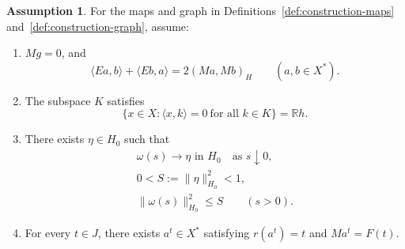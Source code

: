 \documentclass[11pt]{article}
\newcommand{\R}{\mathbb R}
\newcommand{\pair}[2]{\langle #1,#2\rangle}
\theoremstyle{definition}
\newtheorem{assumption}{Assumption}
\theoremstyle{remark}
\begin{document}
\begin{assumption}\label{ass:construction}
For the maps and graph in Definitions~\ref{def:construction-maps} and~\ref{def:construction-graph}, assume:
\begin{enumerate}
\renewcommand{\theenumi}{H\arabic{enumi}}
\renewcommand{\labelenumi}{(\theenumi)}
\item\label{ass:bilinear} $Mg=0$, and
\begin{equation}
\pair{Ea}{b}+\pair{Eb}{a}=2(Ma,Mb)_H
\qquad(a,b\in X^*).
\label{eq:abs-bilinear}
\end{equation}

\item\label{ass:annihilator} The subspace $K$ satisfies
\begin{equation}
\{x\in X:\pair{x}{k}=0\ \text{for all }k\in K\}=\R h.
\label{eq:abs-annihilator}
\end{equation}

\item\label{ass:curve-limit} There exists $\eta\in H_0$ such that
\begin{equation}
\begin{gathered}
\omega(s)\longrightarrow\eta\text{ in }H_0
\quad\text{as }s\downarrow0,\\
0<S:=\|\eta\|_{H_0}^2<1,\\
\|\omega(s)\|_{H_0}^2\le S\qquad(s>0).
\end{gathered}
\label{eq:abs-tail}
\end{equation}

\item\label{ass:realization} For every $t\in J$, there exists $a^t\in X^*$
satisfying $r(a^t)=t$ and $Ma^t=F(t)$.
\end{enumerate}
\end{assumption}
\end{document}
